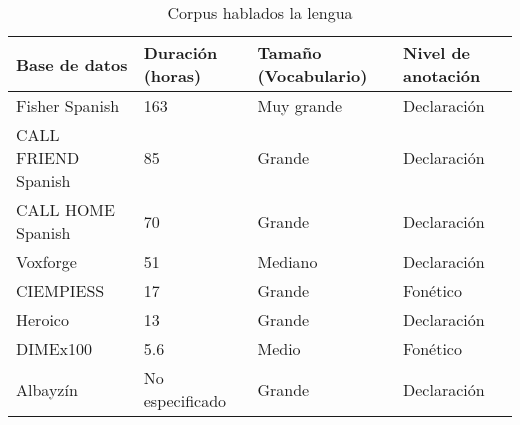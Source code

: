 \begin{table}[H]
\centering
\caption{Corpus hablados la lengua}
\label{tab:spanish_corpora}
\begin{tabular}{|l|l|l|l|}
\toprule
\textbf{Base de datos} & \textbf{Duración (horas)} & \textbf{Tamaño (Vocabulario)} & \textbf{Nivel de anotación}\\
\hline
Fisher Spanish \cite{FischerSpa}  & 163 & Muy grande & Declaración\\
\hline
CALL FRIEND Spanish \cite{CALLFRIENDSpa}  & 85 & Grande & Declaración\\
\hline
CALL HOME Spanish \cite{CALLHOMESpa}  & 70 & Grande & Declaración\\
\hline
Voxforge \cite{Voxforge.org}  & 51 & Mediano & Declaración\\
\hline
CIEMPIESS\cite{Hernandez-MenaCIEMPIESS:Corpus}  & 17 & Grande & Fonético\\
\hline
Heroico \cite{HeroicoCorpus}  & 13 & Grande & Declaración  \\
\hline
DIMEx100\cite{Pineda2004DIMEx100:Spanish}  & 5.6 & Medio & Fonético\\
\hline
Albayzín\cite{CampilloAlbayzinEvaluation}  & No especificado  & Grande & Declaración\\
\hline
\end{tabular}
\end{table}